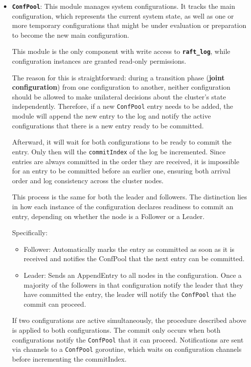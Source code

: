 \begin{itemize}
  \item \textbf{\texttt{ConfPool}}: This module manages system configurations. It tracks the main 
    configuration, which represents the current system state, as well as one or more temporary 
    configurations that might be under evaluation or preparation to become the new main configuration.
  
    This module is the only component with write access to \textbf{\texttt{raft\_log}}, while configuration 
    instances are granted read-only permissions.
  
    The reason for this is straightforward: during a transition phase (\textbf{joint configuration}) 
    from one configuration to another, neither configuration should be allowed to make 
    unilateral decisions about the cluster's state independently. Therefore, if a new \texttt{ConfPool}
    entry needs to be added, the module will append the new 
    entry to the log and notify the active configurations that there is a new entry ready to be committed.

    Afterward, it will wait for both configurations to be ready to commit the entry. Only
    then will the \texttt{commitIndex} of the log be incremented. Since entries are always committed
    in the order they are received, it is impossible for an entry to be committed before an
    earlier one, ensuring both arrival order and log consistency across the cluster nodes.

    This process is the same for both the leader and followers. The distinction lies in how
    each instance of the configuration declares readiness to commit an entry, depending on
    whether the node is a Follower or a Leader.
    
    Specifically:
    \begin{itemize}
      \item Follower: Automatically marks the entry as committed as soon as it is received
        and notifies the ConfPool that the next entry can be committed.
      \item Leader: Sends an AppendEntry to all nodes in the configuration. Once a majority
        of the followers in that configuration notify the leader that they have committed 
        the entry, the leader will notify the \texttt{ConfPool} that the commit can proceed.
    \end{itemize}

    If two configurations are active simultaneously, the procedure described above is
    applied to both configurations. The commit only occurs when both configurations notify
    the \texttt{ConfPool} that it can proceed.
    Notifications are sent via channels to a \texttt{ConfPool} goroutine, which waits on configuration
    channels before incrementing the commitIndex.


\end{itemize}
